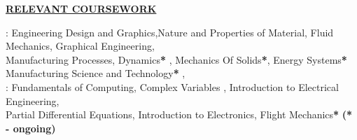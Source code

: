 \documentclass[letterpaper]{deedy-resume} %
\begin{document}
\begin{minipage}[t]{1.00\textwidth}
{\uppercase\uline{\textbf{\large{Relevant Coursework}}\hfill}}

 : Engineering Design and Graphics,Nature and Properties of Material, Fluid Mechanics, Graphical Engineering,\\
	    	\hspace{83pt}  Manufacturing Processes, Dynamics\textbf{*} , Mechanics Of Solids\textbf{*}, Energy Systems\textbf{*}\\
		\hspace{83pt} Manufacturing Science and Technology\textbf{*} , \\
\hspace{46pt} : Fundamentals of Computing, Complex Variables , Introduction to Electrical Engineering,\\ 
		\hspace{83pt} Partial Differential Equations, Introduction to Electronics, Flight Mechanics\textbf{*} \hfill {\small \textbf{(* - ongoing)}}\\

\sectionspace %


\end{minipage} %

\end{document}
